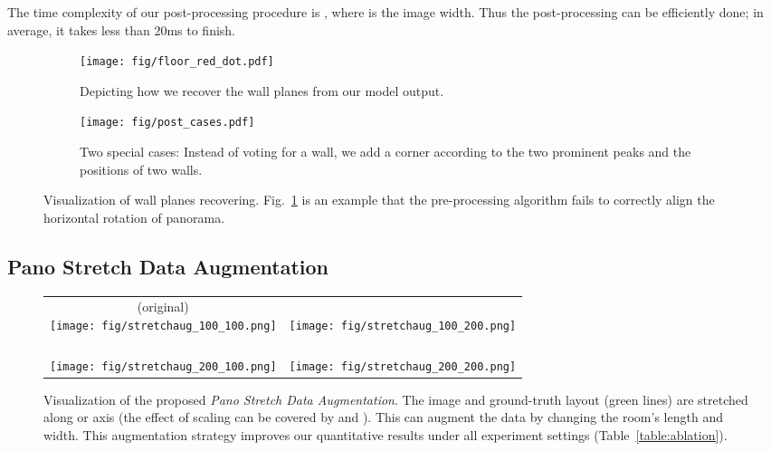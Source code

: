 \documentclass[10pt,twocolumn,letterpaper]{article}
\begin{document}
The time complexity of our post-processing procedure is , where  is the image width. Thus the post-processing can be efficiently done; in average, it takes less than 20ms to finish.

\begin{figure}[h]
    \centering
    \begin{subfigure}[b]{0.96\linewidth}
        \centering
        \texttt{[image: fig/floor\_red\_dot.pdf]}
        \caption{Depicting how we recover the wall planes from our model output.}
        \label{fig:post_walls_a}
    \end{subfigure}
    \begin{subfigure}[b]{0.96\linewidth}
        \centering
        \texttt{[image: fig/post\_cases.pdf]}
        \caption{Two special cases: Instead of voting for a wall, we add a corner according to the two prominent peaks and the positions of two walls.}
        \label{fig:post_walls_b}
    \end{subfigure}
    \caption{Visualization of wall planes recovering. Fig.~\ref{fig:post_walls_a} is an example that the pre-processing algorithm fails to correctly align the horizontal rotation of panorama.}
    \label{fig:post_walls}
\end{figure}
 \subsection{Pano Stretch Data Augmentation} \label{sssec:approach_aug}



\begin{figure}
   \centering
   \setlength\tabcolsep{1pt}
\begin{tabular}{cc}
\makecell{  (original)\\\texttt{[image: fig/stretchaug\_100\_100.png]}}&
\makecell{\\\texttt{[image: fig/stretchaug\_100\_200.png]}}\\
\makecell{\\\texttt{[image: fig/stretchaug\_200\_100.png]}}&
\makecell{\\\texttt{[image: fig/stretchaug\_200\_200.png]}}\\
\end{tabular}

    \caption{Visualization of the proposed \textit{Pano Stretch Data Augmentation}. The image and ground-truth layout (green lines) are stretched along  or  axis (the effect of scaling  can be covered by  and ). This can augment the data by changing the room's length and width. This augmentation strategy improves our quantitative results under all experiment settings (Table~\ref{table:ablation}).
}
    \label{fig:stretch_aug_demo}
\end{figure}
\end{document}
